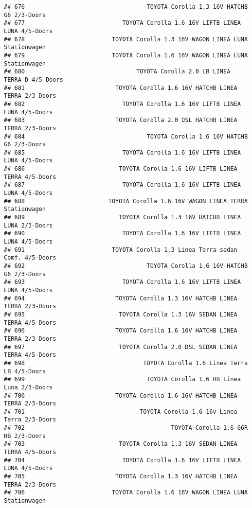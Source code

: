 \documentclass[]{article}
\begin{document}
\begin{verbatim}
## 676                                   TOYOTA Corolla 1.3 16V HATCHB G6 2/3-Doors
## 677                            TOYOTA Corolla 1.6 16V LIFTB LINEA LUNA 4/5-Doors
## 678                         TOYOTA Corolla 1.3 16V WAGON LINEA LUNA Stationwagen
## 679                         TOYOTA Corolla 1.6 16V WAGON LINEA LUNA Stationwagen
## 680                                TOYOTA Corolla 2.0 LB LINEA TERRA D 4/5-Doors
## 681                          TOYOTA Corolla 1.6 16V HATCHB LINEA TERRA 2/3-Doors
## 682                            TOYOTA Corolla 1.6 16V LIFTB LINEA LUNA 4/5-Doors
## 683                          TOYOTA Corolla 2.0 DSL HATCHB LINEA TERRA 2/3-Doors
## 684                                   TOYOTA Corolla 1.6 16V HATCHB G6 2/3-Doors
## 685                            TOYOTA Corolla 1.6 16V LIFTB LINEA LUNA 4/5-Doors
## 686                           TOYOTA Corolla 1.6 16V LIFTB LINEA TERRA 4/5-Doors
## 687                            TOYOTA Corolla 1.6 16V LIFTB LINEA LUNA 4/5-Doors
## 688                        TOYOTA Corolla 1.6 16V WAGON LINEA TERRA Stationwagen
## 689                           TOYOTA Corolla 1.3 16V HATCHB LINEA LUNA 2/3-Doors
## 690                            TOYOTA Corolla 1.6 16V LIFTB LINEA LUNA 4/5-Doors
## 691                         TOYOTA Corolla 1.3 Linea Terra sedan Comf. 4/5-Doors
## 692                                   TOYOTA Corolla 1.6 16V HATCHB G6 2/3-Doors
## 693                            TOYOTA Corolla 1.6 16V LIFTB LINEA LUNA 4/5-Doors
## 694                          TOYOTA Corolla 1.3 16V HATCHB LINEA TERRA 2/3-Doors
## 695                           TOYOTA Corolla 1.3 16V SEDAN LINEA TERRA 4/5-Doors
## 696                          TOYOTA Corolla 1.6 16V HATCHB LINEA TERRA 2/3-Doors
## 697                           TOYOTA Corolla 2.0 DSL SEDAN LINEA TERRA 4/5-Doors
## 698                                  TOYOTA Corolla 1.6 Linea Terra LB 4/5-Doors
## 699                                   TOYOTA Corolla 1.6 HB Linea Luna 2/3-Doors
## 700                          TOYOTA Corolla 1.6 16V HATCHB LINEA TERRA 2/3-Doors
## 701                                 TOYOTA Corolla 1.6-16v Linea Terra 2/3-Doors
## 702                                          TOYOTA Corolla 1.6 G6R HB 2/3-Doors
## 703                           TOYOTA Corolla 1.3 16V SEDAN LINEA TERRA 4/5-Doors
## 704                            TOYOTA Corolla 1.6 16V LIFTB LINEA LUNA 4/5-Doors
## 705                          TOYOTA Corolla 1.3 16V HATCHB LINEA TERRA 2/3-Doors
## 706                         TOYOTA Corolla 1.6 16V WAGON LINEA LUNA Stationwagen

\end{verbatim}
\end{document}
